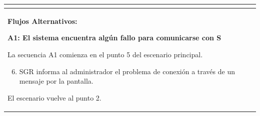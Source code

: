 \begin{longtable}{|l|p{5.5cm}|l|p{2cm}|l|p{1.9cm}|}
{					} \\ \hline

					\multicolumn{6}{|p{15cm}|}{ \textbf{Flujos Alternativos: }
					
					\textbf{A1: El sistema encuentra algún fallo para comunicarse con S}
					
					La secuencia A1 comienza en el punto 5 del escenario principal.
					\begin{enumerate}
							\setcounter{enumi}{5}
							\item SGR informa al administrador el problema de conexión a través de un mensaje por la pantalla.
					\end{enumerate}

					El escenario vuelve al punto 2.

					} \\ \hline

			\end{longtable}

